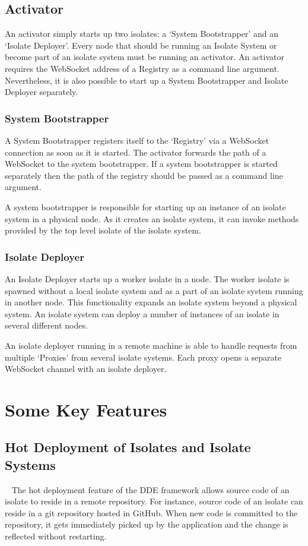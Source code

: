 \subsection{Activator}
  An activator simply starts up two isolates: a ‘System Bootstrapper’ and an ‘Isolate Deployer’. Every node that should be running an Isolate System or become part of an isolate system must be running an activator. An activator requires the WebSocket address of a Registry as a command line argument. Nevertheless, it is also possible to start up a System Bootstrapper and Isolate Deployer separately.

  \subsubsection{System Bootstrapper}
  \label{subsubsec:bootstrapper}
  A System Bootstrapper registers itself to the ‘Registry’ via a WebSocket connection as soon as it is started. The activator forwards the path of a WebSocket to the system bootstrapper. If a system bootstrapper is started separately then the path of the registry should be passed as a command line argument.

  A system bootstrapper is responsible for starting up an instance of an isolate system in a physical node. As it creates an isolate system, it can invoke methods provided by the top level isolate of the isolate system.

  \subsubsection{Isolate Deployer}
  \label{subsubsec:isolateDeployer}
An Isolate Deployer starts up a worker isolate in a node. The worker isolate is spawned without a local isolate system and as a part of an isolate system running in another node. This functionality expands an isolate system beyond a physical system. An isolate system can deploy a number of instances of an isolate in several different nodes.

  An isolate deployer running in a remote machine is able to handle requests from multiple ‘Proxies’ from several isolate systems. Each proxy opens a separate WebSocket channel with an isolate deployer.

\section{Some Key Features}
\subsection{Hot Deployment of Isolates and Isolate Systems}
~\label{subsec:hotDeployment}
The hot deployment feature of the \acrshort{DDE} framework allows source code of an isolate to reside in a remote repository. For instance, source code of an isolate can reside in a git repository hosted in GitHub. When new code is committed to the repository, it gets immediately picked up by the application and the change is reflected without restarting.

